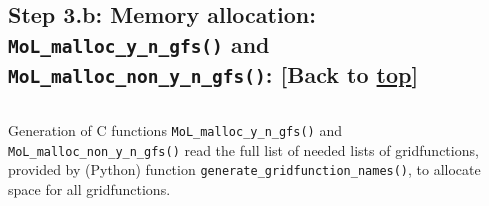 \documentclass[landscape,letterpaper,10pt,english]{article}
\begin{document}
    \hypertarget{step-3.b-memory-allocation-mol_malloc_y_n_gfs-and-mol_malloc_non_y_n_gfs-back-to-top}{%
\subsection{\texorpdfstring{Step 3.b: Memory allocation:
\texttt{MoL\_malloc\_y\_n\_gfs()} and
\texttt{MoL\_malloc\_non\_y\_n\_gfs()}: {[}Back to
\hyperref[toc]{top}{]}}{Step 3.b: Memory allocation: MoL\_malloc\_y\_n\_gfs() and MoL\_malloc\_non\_y\_n\_gfs(): {[}Back to {]}}}\label{step-3.b-memory-allocation-mol_malloc_y_n_gfs-and-mol_malloc_non_y_n_gfs-back-to-top}}

\[\label{alloc}\]

Generation of C functions \texttt{MoL\_malloc\_y\_n\_gfs()} and
\texttt{MoL\_malloc\_non\_y\_n\_gfs()} read the full list of needed
lists of gridfunctions, provided by (Python) function
\texttt{generate\_gridfunction\_names()}, to allocate space for all
gridfunctions.
\end{document}
